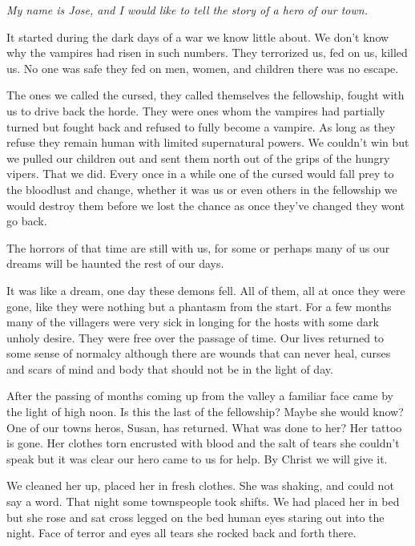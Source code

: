 \begin{center}
	\textit{My name is Jose, and I would like to tell the story of a hero of our town.}
\end{center}		
It started during the dark days of a war we know little about. We don't know why the vampires had risen in such numbers. They terrorized us, fed on us, killed us. No one was safe they fed on men, women, and children there was no escape.

The ones we called the cursed, they called themselves the fellowship, fought with us to drive back the horde. They were ones whom the vampires had partially turned but fought back and refused to fully become a vampire. As long as they refuse they remain human with limited supernatural powers. We couldn't win but we pulled our children out and sent them north out of the grips of the hungry vipers. That we did. Every once in a while one of the cursed would fall prey to the bloodlust and change, whether it was us or even others in the fellowship we would destroy them before we lost the chance as once they've changed they wont go back.

The horrors of that time are still with us, for some or perhaps many of us our dreams will be haunted the rest of our days.

It was like a dream, one day these demons fell. All of them, all at once they were gone, like they were nothing but a phantasm from the start. For a few months many of the villagers were very sick in longing for the hosts with some dark unholy desire. They were free over the passage of time. Our lives returned to some sense of normalcy although there are wounds that can never heal, curses and scars of mind and body that should not be in the light of day.

After the passing of months coming up from the valley a familiar face came by the light of high noon. Is this the last of the fellowship? Maybe she would know? One of our towns heros, Susan, has returned. What was done to her? Her tattoo is gone. Her clothes torn encrusted with blood and the salt of tears she couldn't speak but it was clear our hero came to us for help. By Christ we will give it.

We cleaned her up, placed her in fresh clothes. She was shaking, and could not say a word. That night some townspeople took shifts. We had placed her in bed but she rose and sat cross legged on the bed human eyes staring out into the night. Face of terror and eyes all tears she rocked back and forth there.

